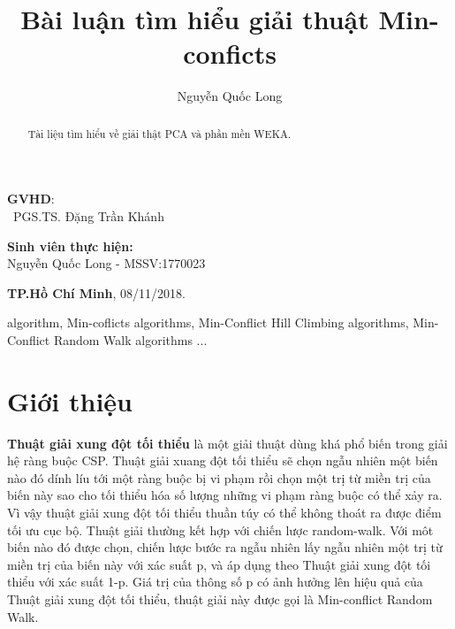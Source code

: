 \documentclass{hcmutarticle}
\begin{document}
\vspace{2cm}

\begin{minipage}[t]{0.60\linewidth}
\textbf{GVHD}: \\
\ PGS.TS. Đặng Trần Khánh
\end{minipage}
\begin{minipage}[t]{0.40\linewidth}
\textbf{Sinh viên thực hiện:}\\
Nguyễn Quốc Long - MSSV:1770023
\end{minipage}

\vspace{4cm}

\begin{center}

\textbf{TP.Hồ Chí Minh},
08/11/2018.

\end{center}



\newpage

\tableofcontents 

\newpage

\title{Bài luận tìm hiểu giải thuật Min-conficts}

\author{  Nguyễn Quốc Long} 





\maketitle



\begin{abstract}
Tài liệu tìm hiểu về giải thật PCA và phần mền WEKA.


\end{abstract}

\begin{keywords}
algorithm, Min-coflicts algorithms, Min-Conflict Hill Climbing algorithms, Min-Conflict Random Walk algorithms ...
\end{keywords} 


\section{Giới thiệu}

\textbf{Thuật giải xung đột tối thiểu} 
 là một giải thuật dùng khá phổ biến trong giải hệ ràng buộc CSP. Thuật giải xuang đột tối thiểu sẽ chọn ngẫu nhiên một biến nào đó dính líu tới một ràng buộc bị vi phạm rồi chọn một trị từ miền trị của biến này sao cho tối thiểu hóa số lượng những vi phạm ràng buộc có thể xảy ra. Vì vậy thuật giải xung đột tối thiểu thuần túy có thể không thoát ra được điểm tối ưu cục bộ. Thuật giải thường kết hợp với chiến lược random-walk. Với môt biến nào đó được chọn, chiến lược bước ra ngẫu nhiên lấy ngẫu nhiên một trị từ miền trị của biến này với xác suất p, và áp dụng theo Thuật giải xung đột tối thiểu với xác suất 1-p. Giá trị của thông số p có ảnh hưởng lên hiệu quả của Thuật giải xung đột tối thiểu, thuật giải này được gọi là Min-conflict Random Walk.
\end{document}
